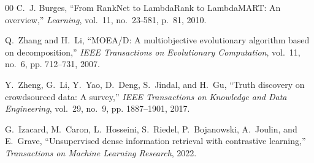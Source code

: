 \documentclass[conference,onecolumn,10pt]{IEEEtran}
\begin{document}
\begin{thebibliography}{00}
C.~J. Burges, ``From {RankNet} to {LambdaRank} to {LambdaMART}: An overview,'' \textit{Learning}, vol.~11, no.~23-581, p.~81, 2010.

Q.~Zhang and H.~Li, ``{MOEA/D}: A multiobjective evolutionary algorithm based on decomposition,'' \textit{IEEE Transactions on Evolutionary Computation}, vol.~11, no.~6, pp. 712--731, 2007.

Y.~Zheng, G.~Li, Y.~Yao, D.~Deng, S.~Jindal, and H.~Gu, ``Truth discovery on crowdsourced data: A survey,'' \textit{IEEE Transactions on Knowledge and Data Engineering}, vol.~29, no.~9, pp. 1887--1901, 2017.

G.~Izacard, M.~Caron, L.~Hosseini, S.~Riedel, P.~Bojanowski, A.~Joulin, and E.~Grave, ``Unsupervised dense information retrieval with contrastive learning,'' \textit{Transactions on Machine Learning Research}, 2022.

\end{thebibliography}
\end{document}
